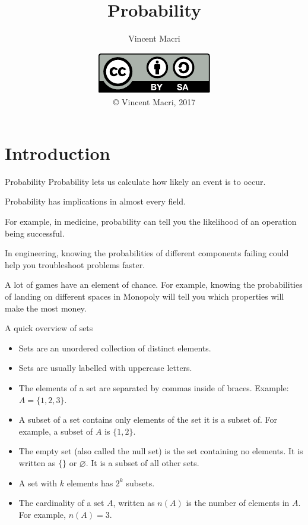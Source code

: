 

\title{Probability}
\author{Vincent Macri}
\date{\includegraphics{../LicenseLogo}\\\copyright{} Vincent Macri, 2017}


	\frame{\titlepage}
	\section{Introduction}
	\begin{namedframe}{Probability}
		Probability lets us calculate how likely an event is to occur.
		\pause

		Probability has implications in almost every field.  \pause

		For example, in medicine, probability can tell you the likelihood of an operation being successful.
		\pause

		In engineering, knowing the probabilities of different components failing could help you troubleshoot problems faster.
		\pause

		A lot of games have an element of chance. For example, knowing the probabilities of landing on different spaces in Monopoly will tell you which properties will make the most money.
	\end{namedframe}
	\begin{namedframe}{A quick overview of sets}
		\begin{itemize}[<+->]
			\item Sets are an \alert{unordered} collection of \alert{distinct} elements.
			\item Sets are usually labelled with uppercase letters.
			\item The elements of a set are separated by commas inside of braces. Example: $A = \{1,2,3\}$.
			\item A subset of a set contains only elements of the set it is a subset of. For example, a subset of $A$ is $\{1,2\}$.
			\item The empty set (also called the null set) is the set containing no elements. It is written as $\{\}$ or $\varnothing$. It is a subset of all other sets.
			\item A set with $k$ elements has $2^k$ subsets.
			\item The cardinality of a set $A$, written as $n(A)$ is the number of elements in $A$. For example, $n(A) = 3$.
		\end{itemize}
	\end{namedframe}
